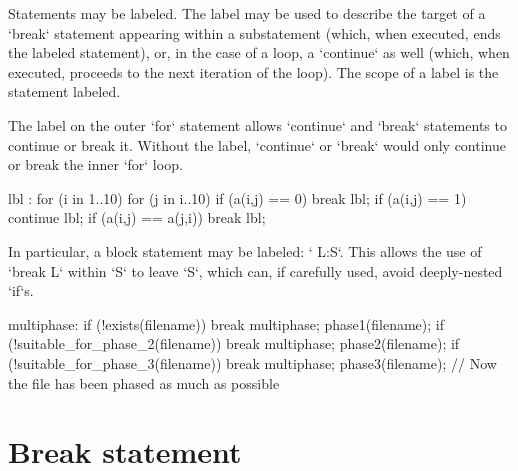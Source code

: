 Statements may be labeled. The label may be used to describe the target of a
\xcd`break` statement appearing within a substatement (which, when executed,
ends the labeled statement), or, in the case of a loop, a \xcd`continue` as
well (which, when executed, proceeds to the next iteration of the loop). The
scope of a label is the statement labeled.

\begin{ex}
The label on the outer \xcd`for` statement allows \xcd`continue` and
\xcd`break` statements to continue or break it.  Without the label,
\xcd`continue` or \xcd`break` would only continue or break the inner \xcd`for`
loop. 
\begin{xten}
lbl : for (i in 1..10) {
   for (j in i..10) {  
      if (a(i,j) == 0) break lbl;
      if (a(i,j) == 1) continue lbl;
      if (a(i,j) == a(j,i)) break lbl;
   }
}
\end{xten}
\end{ex}

In particular, a block statement may be labeled: \xcd` L:{S}`.  This allows
the use of \xcd`break L` within \xcd`S` to leave \xcd`S`, which can, if
carefully used, avoid deeply-nested \xcd`if`s. 

\begin{ex}
\begin{xten}
multiphase: {
  if (!exists(filename)) break multiphase;
  phase1(filename);
  if (!suitable_for_phase_2(filename)) break multiphase;
  phase2(filename);
  if (!suitable_for_phase_3(filename)) break multiphase;
  phase3(filename);
}
// Now the file has been phased as much as possible
\end{xten}
\end{ex}


\section{Break statement}

